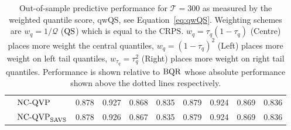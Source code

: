 \begin{table}[H]
{\begin{tabular}{ll|cccc|cccc}
 & $\operatorname{NC-QVP}$ & 0.878 & 0.927 & 0.868 & 0.835 & 0.879 & 0.924 & 0.869 & 0.836 \\
 & $\operatorname{NC-QVP}_{\mathrm{SAVS}}$ & 0.878 & 0.926 & 0.867 & 0.835 & 0.879 & 0.924 & 0.869 & 0.836 \\ \hline
\end{tabular}%
}
\caption{Out-of-sample predictive performance for $\mathcal{T}=300$ as measured by the weighted quantile score, $\mathrm{qwQS}$, see Equation~\ref{eq:qwQS}. Weighting schemes are $w_{q} = 1/\mathcal{Q}$ ($\operatorname{QS}$) which is equal to the $\mathrm{CRPS}$. $w_{q} = \tau_q(1-\tau_q)$ (Centre) places more weight the central quantiles, $w_{q} = (1-\tau_q)^2$ (Left) places more weight on left tail quantiles, $w_{\tau_q} = \tau^2_q$ (Right) places more weight on right tail quantiles. Performance is shown relative to $\operatorname{BQR}$ whose absolute performance shown above the dotted lines respectively.}
\label{tab:overallbias_main_correlation}
\end{table}
